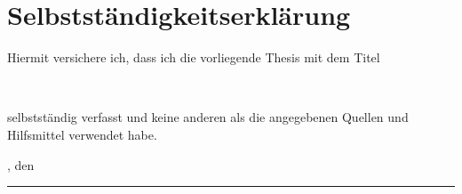 
\setcounter{page}{2}
\section*{Selbstständigkeitserklärung}
	Hiermit versichere ich, dass ich die vorliegende Thesis mit dem Titel\\
\begin{center}
	\glqq \titelPraxisbericht \grqq{}  \\
\end{center}
	selbstständig verfasst und keine anderen als die angegebenen Quellen und Hilfsmittel verwendet habe.\\

\begin{flushright}
	\abgabeortPraxisbericht, den \datumAbgabePraxisbericht \\
\vspace{1cm} 
\rule {6cm}{0.2mm}\\
	\autorPraxisbericht
\end{flushright}
